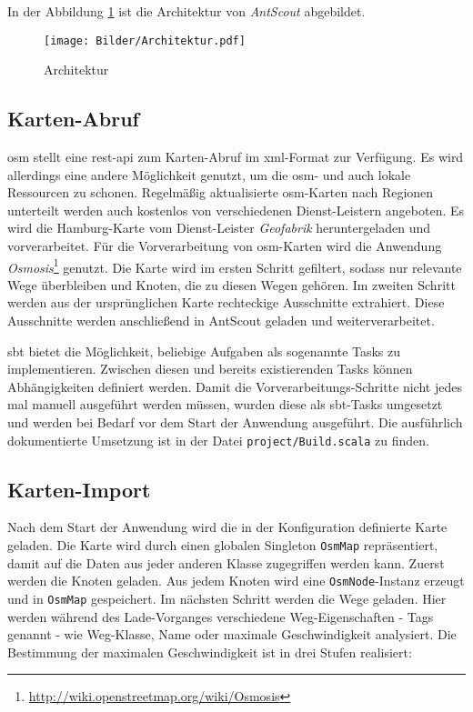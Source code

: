 In der Abbildung \ref{fig:architektur} ist die Architektur von \textit{AntScout} abgebildet.

\begin{figure}[htbp]
  \centering
  \texttt{[image: Bilder/Architektur.pdf]}
  \caption{Architektur}
  \label{fig:architektur}
\end{figure}

\subsection{Karten-Abruf}
\label{sec:karten-abruf}

\gls{osm} stellt eine \gls{rest}-\gls{api} zum Karten-Abruf im \gls{xml}-Format zur Verfügung.
Es wird allerdings eine andere Möglichkeit genutzt, um die \gls{osm}- und auch lokale Ressourcen zu schonen.
Regelmäßig aktualisierte \gls{osm}-Karten nach Regionen unterteilt werden auch kostenlos von verschiedenen Dienst-Leistern angeboten.
Es wird die Hamburg-Karte vom Dienst-Leister \textit{Geofabrik} heruntergeladen und vorverarbeitet.
Für die Vorverarbeitung von \gls{osm}-Karten wird die Anwendung \textit{Osmosis}\footnote{\url{http://wiki.openstreetmap.org/wiki/Osmosis}} genutzt.
Die Karte wird im ersten Schritt gefiltert, sodass nur relevante Wege überbleiben und Knoten, die zu diesen Wegen gehören.
Im zweiten Schritt werden aus der ursprünglichen Karte rechteckige Ausschnitte extrahiert.
Diese Ausschnitte werden anschließend in AntScout geladen und weiterverarbeitet.

\gls{sbt} bietet die Möglichkeit, beliebige Aufgaben als sogenannte Tasks zu implementieren.
Zwischen diesen und bereits existierenden Tasks können Abhängigkeiten definiert werden.
Damit die Vorverarbeitungs-Schritte nicht jedes mal manuell ausgeführt werden müssen, wurden diese als \gls{sbt}-Tasks umgesetzt und werden bei Bedarf vor dem Start der Anwendung ausgeführt.
Die ausführlich dokumentierte Umsetzung ist in der Datei \texttt{project/Build.scala} zu finden.

\subsection{Karten-Import}
\label{sec:karten-import}

Nach dem Start der Anwendung wird die in der Konfiguration definierte Karte geladen.
Die Karte wird durch einen globalen Singleton \texttt{OsmMap} repräsentiert, damit auf die Daten aus jeder anderen Klasse zugegriffen werden kann.
Zuerst werden die Knoten geladen.
Aus jedem Knoten wird eine \texttt{OsmNode}-Instanz erzeugt und in \texttt{OsmMap} gespeichert.
Im nächsten Schritt werden die Wege geladen.
Hier werden während des Lade-Vorganges verschiedene Weg-Eigenschaften - Tags genannt - wie Weg-Klasse, Name oder maximale Geschwindigkeit analysiert.
Die Bestimmung der maximalen Geschwindigkeit ist in drei Stufen realisiert:

